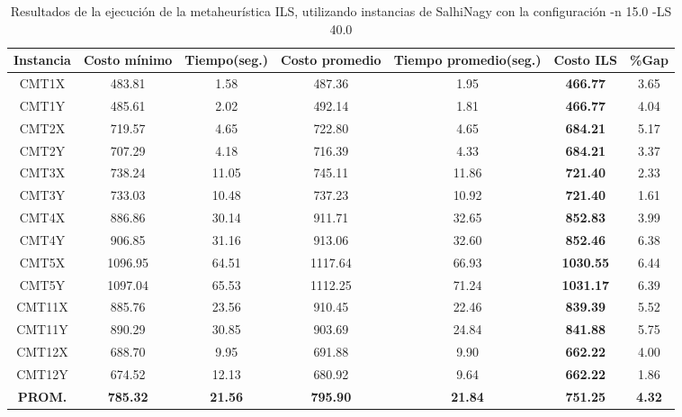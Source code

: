 \begin{table}[ht]
\caption{Resultados de la ejecución de la metaheurística ILS, utilizando instancias de SalhiNagy con la configuración -n 15.0 -LS 40.0}
\centering
\small
\begin{tabular}{c c c c c c c}
\hline\hline
Instancia & Costo mínimo & Tiempo(seg.) & Costo promedio & Tiempo promedio(seg.) & Costo ILS & \%Gap \\ [0.5ex]
\hline
CMT1X & 483.81 & 1.58 & 
487.36 & 1.95 & \bf{466.77} & 
3.65\\CMT1Y & 485.61 & 2.02 & 
492.14 & 1.81 & \bf{466.77} & 
4.04\\CMT2X & 719.57 & 4.65 & 
722.80 & 4.65 & \bf{684.21} & 
5.17\\CMT2Y & 707.29 & 4.18 & 
716.39 & 4.33 & \bf{684.21} & 
3.37\\CMT3X & 738.24 & 11.05 & 
745.11 & 11.86 & \bf{721.40} & 
2.33\\CMT3Y & 733.03 & 10.48 & 
737.23 & 10.92 & \bf{721.40} & 
1.61\\CMT4X & 886.86 & 30.14 & 
911.71 & 32.65 & \bf{852.83} & 
3.99\\CMT4Y & 906.85 & 31.16 & 
913.06 & 32.60 & \bf{852.46} & 
6.38\\CMT5X & 1096.95 & 64.51 & 
1117.64 & 66.93 & \bf{1030.55} & 
6.44\\CMT5Y & 1097.04 & 65.53 & 
1112.25 & 71.24 & \bf{1031.17} & 
6.39\\CMT11X & 885.76 & 23.56 & 
910.45 & 22.46 & \bf{839.39} & 
5.52\\CMT11Y & 890.29 & 30.85 & 
903.69 & 24.84 & \bf{841.88} & 
5.75\\CMT12X & 688.70 & 9.95 & 
691.88 & 9.90 & \bf{662.22} & 
4.00\\CMT12Y & 674.52 & 12.13 & 
680.92 & 9.64 & \bf{662.22} & 
1.86\\\bf{PROM.} & 
\bf{785.32} & \bf{21.56} & \bf{795.90} & \bf{21.84} & \bf{751.25} & \bf{4.32}\\[1ex]\hline
\end{tabular}
\label{table:nonlin}
\end{table} \clearpage

